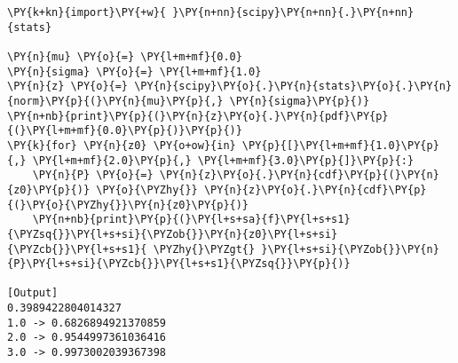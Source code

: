 \begin{Verbatim}[label=\makebox{\href{https://github.com/unipi-physics-labs/statnotes/tree/main/snippy/scipy.stats.norm.py}{https://github.com/.../scipy.stats.norm.py}},commandchars=\\\{\}]
\PY{k+kn}{import}\PY{+w}{ }\PY{n+nn}{scipy}\PY{n+nn}{.}\PY{n+nn}{stats}

\PY{n}{mu} \PY{o}{=} \PY{l+m+mf}{0.0}
\PY{n}{sigma} \PY{o}{=} \PY{l+m+mf}{1.0}
\PY{n}{z} \PY{o}{=} \PY{n}{scipy}\PY{o}{.}\PY{n}{stats}\PY{o}{.}\PY{n}{norm}\PY{p}{(}\PY{n}{mu}\PY{p}{,} \PY{n}{sigma}\PY{p}{)}
\PY{n+nb}{print}\PY{p}{(}\PY{n}{z}\PY{o}{.}\PY{n}{pdf}\PY{p}{(}\PY{l+m+mf}{0.0}\PY{p}{)}\PY{p}{)}
\PY{k}{for} \PY{n}{z0} \PY{o+ow}{in} \PY{p}{[}\PY{l+m+mf}{1.0}\PY{p}{,} \PY{l+m+mf}{2.0}\PY{p}{,} \PY{l+m+mf}{3.0}\PY{p}{]}\PY{p}{:}
    \PY{n}{P} \PY{o}{=} \PY{n}{z}\PY{o}{.}\PY{n}{cdf}\PY{p}{(}\PY{n}{z0}\PY{p}{)} \PY{o}{\PYZhy{}} \PY{n}{z}\PY{o}{.}\PY{n}{cdf}\PY{p}{(}\PY{o}{\PYZhy{}}\PY{n}{z0}\PY{p}{)}
    \PY{n+nb}{print}\PY{p}{(}\PY{l+s+sa}{f}\PY{l+s+s1}{\PYZsq{}}\PY{l+s+si}{\PYZob{}}\PY{n}{z0}\PY{l+s+si}{\PYZcb{}}\PY{l+s+s1}{ \PYZhy{}\PYZgt{} }\PY{l+s+si}{\PYZob{}}\PY{n}{P}\PY{l+s+si}{\PYZcb{}}\PY{l+s+s1}{\PYZsq{}}\PY{p}{)}

[Output]
0.3989422804014327
1.0 -> 0.6826894921370859
2.0 -> 0.9544997361036416
3.0 -> 0.9973002039367398
\end{Verbatim}
